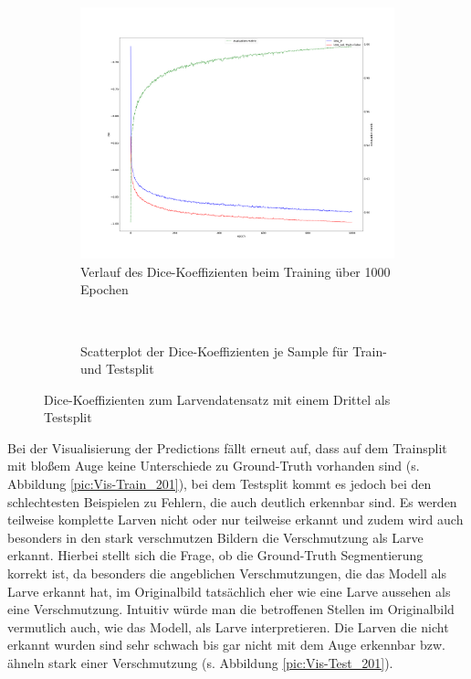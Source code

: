\begin{figure}[H]
\centering
\begin{minipage}{.6\textwidth}
\begin{subfigure}{\textwidth}
\centering
\includegraphics[width=\textwidth]{Pictures/nnUnet/Praxis/Task201-Larven-drittel-testsplit/progress_201-Larven-drittel-testsplit.png}
\caption{Verlauf des Dice-Koeffizienten beim Training über 1000 Epochen}
\label{pic:Prog_201}
\end{subfigure}
\end{minipage}%
\\
\begin{minipage}{.4\textwidth}
\begin{subfigure}{\textwidth}

\caption{Scatterplot der Dice-Koeffizienten je Sample für Train- und Testsplit}
\label{pic:Dice_201}
\end{subfigure}
\end{minipage}

\caption{Dice-Koeffizienten zum Larvendatensatz mit einem Drittel als Testsplit}
\end{figure}

Bei der Visualisierung der Predictions fällt erneut auf, dass auf dem Trainsplit mit bloßem Auge keine Unterschiede zu Ground-Truth vorhanden sind (s. Abbildung \ref{pic:Vis-Train_201}), bei dem Testsplit kommt es jedoch bei den schlechtesten Beispielen zu Fehlern, die auch deutlich erkennbar sind. Es werden teilweise komplette Larven nicht oder nur teilweise erkannt und zudem wird auch besonders in den stark verschmutzen Bildern die Verschmutzung als Larve erkannt. Hierbei stellt sich die Frage, ob die Ground-Truth Segmentierung korrekt ist, da besonders die angeblichen Verschmutzungen, die das Modell als Larve erkannt hat, im Originalbild tatsächlich eher wie eine Larve aussehen als eine Verschmutzung. Intuitiv würde man die betroffenen Stellen im Originalbild vermutlich auch, wie das Modell, als Larve interpretieren. Die Larven die nicht erkannt wurden sind sehr schwach bis gar nicht mit dem Auge erkennbar bzw. ähneln stark einer Verschmutzung (s. Abbildung \ref{pic:Vis-Test_201}).


